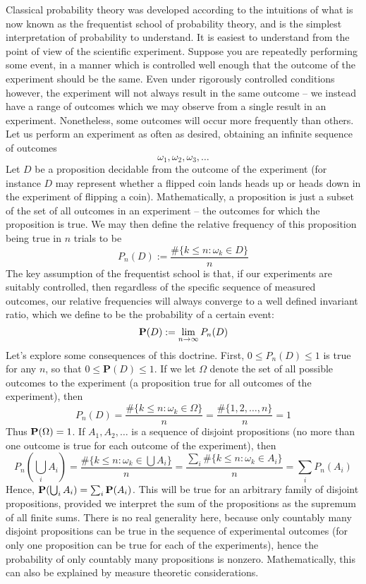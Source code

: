 Classical probability theory was developed according to the intuitions of what is now known as the frequentist school of probability theory, and is the simplest interpretation of probability to understand. It is easiest to understand from the point of view of the scientific experiment. Suppose you are repeatedly performing some event, in a manner which is controlled well enough that the outcome of the experiment should be the same. Even under rigorously controlled conditions however, the experiment will not always result in the same outcome -- we instead have a range of outcomes which we may observe from a single result in an experiment. Nonetheless, some outcomes will occur more frequently than others. Let us perform an experiment as often as desired, obtaining an infinite sequence of outcomes
%
\[ \omega_1, \omega_2, \omega_3, \dots \]
%
Let $D$ be a proposition decidable from the outcome of the experiment (for instance $D$ may represent whether a flipped coin lands heads up or heads down in the experiment of flipping a coin). Mathematically, a proposition is just a subset of the set of all outcomes in an experiment -- the outcomes for which the proposition is true. We may then define the relative frequency of this proposition being true in $n$ trials to be
%
\[ P_n(D) := \frac{\# \{ k \leq n : \omega_k \in D \}}{n} \]
%
The key assumption of the frequentist school is that, if our experiments are suitably controlled, then regardless of the specific sequence of measured outcomes, our relative frequencies will always converge to a well defined invariant ratio, which we define to be the probability of a certain event:
%
\[ \operatorname{\mathbf{P}}(D) := \lim_{n \to \infty} P_n(D) \]
%
Let's explore some consequences of this doctrine. First, $0 \leq P_n(D) \leq 1$ is true for any $n$, so that $0 \leq \mathbf{P}(D) \leq 1$. If we let $\Omega$ denote the set of all possible outcomes to the experiment (a proposition true for all outcomes of the experiment), then
%
\[ P_n(D) = \frac{\# \{ k \leq n : \omega_k \in \Omega\}}{n} = \frac{\# \{ 1, 2, \dots, n \}}{n} = 1 \]
%
Thus $\operatorname{\mathbf{P}}(\Omega) = 1$. If $A_1, A_2, \dots$ is a sequence of disjoint propositions (no more than one outcome is true for each outcome of the experiment), then
%
\[ P_n \left( \bigcup_i A_i \right) = \frac{\# \{ k \leq n : \omega_k \in \bigcup A_i \}}{n} = \frac{\sum_i \# \{ k \leq n : \omega_k \in A_i \}}{n} = \sum_i P_n(A_i) \]
%
Hence, $\operatorname{\mathbf{P}}(\bigcup_i A_i) = \sum_i \operatorname{\mathbf{P}}(A_i)$. This will be true for an arbitrary family of disjoint propositions, provided we interpret the sum of the propositions as the supremum of all finite sums. There is no real generality here, because only countably many disjoint propositions can be true in the sequence of experimental outcomes (for only one proposition can be true for each of the experiments), hence the probability of only countably many propositions is nonzero. Mathematically, this can also be explained by measure theoretic considerations.



